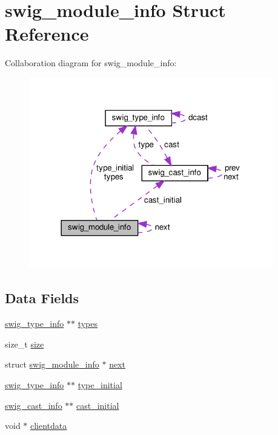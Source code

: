 \hypertarget{structswig__module__info}{}\section{swig\+\_\+module\+\_\+info Struct Reference}
\label{structswig__module__info}


Collaboration diagram for swig\+\_\+module\+\_\+info\+:\nopagebreak
\begin{figure}[H]
\begin{center}
\leavevmode
\includegraphics[width=302pt]{structswig__module__info__coll__graph}
\end{center}
\end{figure}
\subsection*{Data Fields}
\begin{DoxyCompactItemize}
\item 
\hyperlink{structswig__type__info}{swig\+\_\+type\+\_\+info} $\ast$$\ast$ \hyperlink{structswig__module__info_ad658c7738e9a035ef8eea865322fbf13}{types}
\item 
size\+\_\+t \hyperlink{structswig__module__info_aaf8907cf8509ee0464af8c9dfd909042}{size}
\item 
struct \hyperlink{structswig__module__info}{swig\+\_\+module\+\_\+info} $\ast$ \hyperlink{structswig__module__info_ac177d150b85ab77122089acf1f06d9c6}{next}
\item 
\hyperlink{structswig__type__info}{swig\+\_\+type\+\_\+info} $\ast$$\ast$ \hyperlink{structswig__module__info_a76c7d5b0fc10371748616d0b6c815a17}{type\+\_\+initial}
\item 
\hyperlink{structswig__cast__info}{swig\+\_\+cast\+\_\+info} $\ast$$\ast$ \hyperlink{structswig__module__info_a15f6b50a41f144afb1148fc412dc01f7}{cast\+\_\+initial}
\item 
void $\ast$ \hyperlink{structswig__module__info_a9fb6e461fcaf14c209049adfae4e9754}{clientdata}
\end{DoxyCompactItemize}



